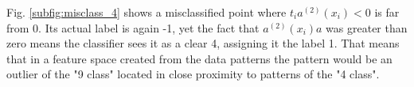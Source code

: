	Fig. \ref{subfig:misclass_4} shows a misclassified point where $t_i a^{(2)}(x_i)<0$ is far from 0. Its actual label is again -1, yet the fact that $a^{(2)}(x_i)a$ was greater than zero means the classifier sees it as a clear 4, assigning it the label 1. That means that in a feature space created from the data patterns the pattern would be an outlier of the "9 class" located in close proximity to patterns of the "4 class".

